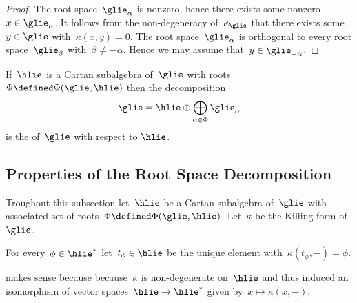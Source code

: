 \begin{proof}
  The root space~$\glie_\alpha$ is nonzero, hence there exists some nonzero~$x \in \glie_\alpha$.
  It follows from the non-degeneracy of~$\kappa_{\glie}$ that there exists some~$y \in \glie$ with~$\kappa(x,y) = 0$.
  The root space~$\glie_\alpha$ is orthogonal to every root space~$\glie_\beta$ with~$\beta \neq -\alpha$.
  Hence we may assume that~$y \in \glie_{-\alpha}$.
\end{proof}


\begin{definition}
  If~$\hlie$ is a Cartan subalgebra of~$\glie$ with roots~$\Phi \defined \Phi(\glie, \hlie)$ then the decomposition
  \[
    \glie
    = 
    \hlie \oplus \bigoplus_{\alpha \in \Phi} \glie_\alpha
  \]
  is the  of~$\glie$ with respect to $\hlie$.
\end{definition}





\subsection{Properties of the Root Space Decomposition}


\begin{convention}
  Troughout this subsection let~$\hlie$ be a Cartan subalgebra of~$\glie$ with associated set of roots~$\Phi \defined \Phi(\glie,\hlie)$.
  Let~$\kappa$ be the Killing form of~$\glie$.
\end{convention}


\begin{definition}
  \label{def of t_phi}
  For every~$\phi \in \hlie^*$ let~$t_\phi \in \hlie$ be the unique element with~$\kappa(t_{\phi}, -) = \phi$.
\end{definition}


\begin{remark}
   makes sense because because~$\kappa$ is non-degenerate on~$\hlie$ and thus induced an isomorphism of vector spaces~$\hlie \to \hlie^*$ given by~$x \mapsto \kappa(x,-)$.
\end{remark}


